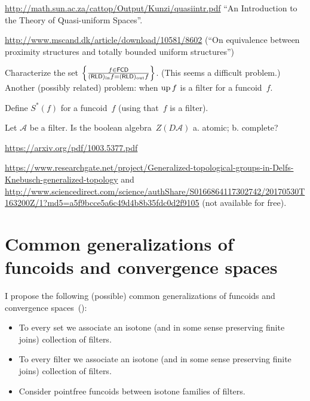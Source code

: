 \documentclass{amsart}
\begin{document}
\url{http://math.sun.ac.za/cattop/Output/Kunzi/quasiintr.pdf} ``An Introduction to the Theory of Quasi-uniform Spaces''.

\url{http://www.mscand.dk/article/download/10581/8602} (``On equivalence between proximity structures and totally bounded uniform structures'')

Characterize the set $\left\{ \frac{f\in\mathsf{FCD}}{(\mathsf{RLD})_{\mathrm{in}} f=(\mathsf{RLD})_{\mathrm{out}} f}\right\}$. (This seems a difficult problem.)
Another (possibly related) problem: when $\operatorname{up} f$ is a filter for a funcoid~$f$.

Define $S^\ast (f)$ for a funcoid~$f$ (using that~$f$ is a filter).

Let $\mathcal{A}$ be a filter. Is the boolean algebra~$Z(D\mathcal{A})$
a. atomic; b. complete?

\url{https://arxiv.org/pdf/1003.5377.pdf}

\url{https://www.researchgate.net/project/Generalized-topological-groups-in-Delfs-Knebusch-generalized-topology}
and
\url{http://www.sciencedirect.com/science/authShare/S0166864117302742/20170530T163200Z/1?md5=a5f9bcce5a6c49d4b8b35fdc0d2f9105}
(not available for free).

\section{Common generalizations of funcoids and convergence spaces}

I propose the following (possible) common generalizations of funcoids and convergence spaces~(\cite{converg}):

\begin{itemize}
\item To every set we associate an isotone (and in some sense preserving finite joins) collection of filters.
\item To every filter we associate an isotone (and in some sense preserving finite joins) collection of filters.
\item Consider pointfree funcoids between isotone families of filters.
\end{itemize}



\end{document}
